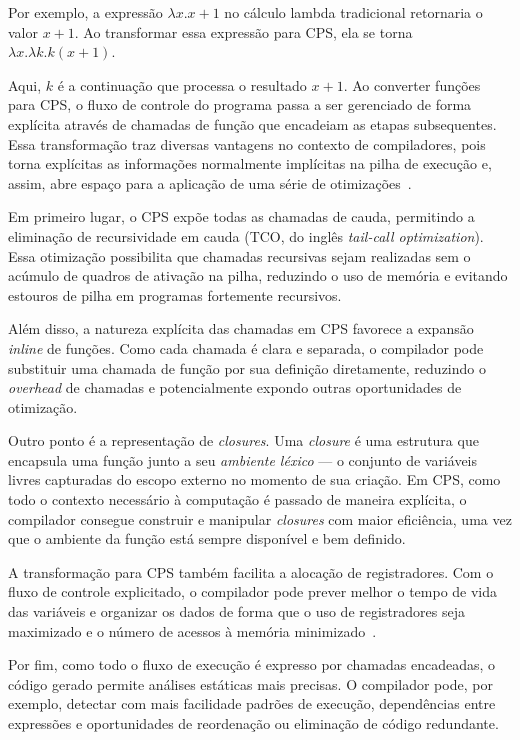 Por exemplo, a expressão $\lambda x. x + 1$ no cálculo lambda tradicional retornaria o valor $x + 1$. Ao transformar essa expressão para CPS, ela se torna $\lambda x. \lambda k. k (x + 1)$.

Aqui, $k$ é a continuação que processa o resultado $x + 1$.
Ao converter funções para CPS, o fluxo de controle do programa passa a ser gerenciado de forma explícita através de chamadas de função que encadeiam as etapas subsequentes.
Essa transformação traz diversas vantagens no contexto de compiladores, pois torna explícitas as informações normalmente implícitas na pilha de execução e, assim, abre espaço para a aplicação de uma série de otimizações~\cite{appel1992compiling}.  

Em primeiro lugar, o CPS expõe todas as chamadas de cauda, permitindo a eliminação de recursividade em cauda (TCO, do inglês \textit{tail-call optimization}).
Essa otimização possibilita que chamadas recursivas sejam realizadas sem o acúmulo de quadros de ativação na pilha, reduzindo o uso de memória e evitando estouros de pilha em programas fortemente recursivos.

Além disso, a natureza explícita das chamadas em CPS favorece a expansão \textit{inline} de funções.
Como cada chamada é clara e separada, o compilador pode substituir uma chamada de função por sua definição diretamente, reduzindo o \textit{overhead} de chamadas e potencialmente expondo outras oportunidades de otimização.

Outro ponto é a representação de \textit{closures}.
Uma \textit{closure} é uma estrutura que encapsula uma função junto a seu \textit{ambiente léxico} {---} o conjunto de variáveis livres capturadas do escopo externo no momento de sua criação.
Em CPS, como todo o contexto necessário à computação é passado de maneira explícita, o compilador consegue construir e manipular \textit{closures} com maior eficiência, uma vez que o ambiente da função está sempre disponível e bem definido.

A transformação para CPS também facilita a alocação de registradores.
Com o fluxo de controle explicitado, o compilador pode prever melhor o tempo de vida das variáveis e organizar os dados de forma que o uso de registradores seja maximizado e o número de acessos à memória minimizado~\cite{appel1992compiling}.

Por fim, como todo o fluxo de execução é expresso por chamadas encadeadas, o código gerado permite análises estáticas mais precisas.
O compilador pode, por exemplo, detectar com mais facilidade padrões de execução, dependências entre expressões e oportunidades de reordenação ou eliminação de código redundante.

